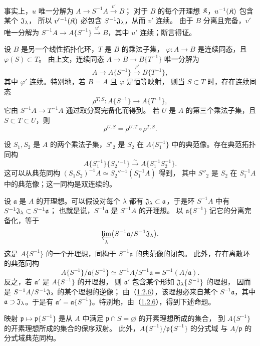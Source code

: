 事实上，$u$ 唯一分解为 $A\to S^{-1}A\xrightarrow{v'}B$；
对于 $B$ 的每个开理想 $\mathfrak K$，$u^{-1}(\mathfrak K)$ 包含某个 $\mathfrak J_\lambda$，
所以 $v'{}^{-1}(\mathfrak K)$ 必包含 $S^{-1}\mathfrak J_\lambda$，从而 $v'$ 连续。
由于 $B$ 分离且完备，$v'$ 唯一分解为
$S^{-1}A\to A\{S^{-1}\}\xrightarrow{u'}B$，其中 $u'$ 连续；断言得证。

设 $B$ 是另一个线性拓扑化环，$T$ 是 $B$ 的乘法子集，
$\varphi:A\to B$ 是连续同态，且 $\varphi(S)\subset T$。
由上文，连续同态 $A\to B\to B\{T^{-1}\}$ 唯一分解为
\[
 A\longrightarrow A\{S^{-1}\}\xrightarrow{\varphi'}B\{T^{-1}\},
\]
其中 $\varphi'$ 连续。特别地，若 $B=A$ 且 $\varphi$ 是恒等映射，
则当 $S\subset T$ 时，存在连续同态
\[
 \rho^{T,S}:A\{S^{-1}\}\longrightarrow A\{T^{-1}\},
\]
它由 $S^{-1}A\to T^{-1}A$ 通过取分离完备化而得到。
若 $U$ 是 $A$ 的第三个乘法子集，且 $S\subset T\subset U$，则
\[
 \rho^{U,S}=\rho^{U,T}\circ\rho^{T,S}.
\]

设 $S_1,S_2$ 是 $A$ 的两个乘法子集，$S'_2$ 是 $S_2$ 在
$A\{S_1^{-1}\}$ 中的典范像。存在典范拓扑同构
\[
 A\{S_1^{-1}\}\{S_2'{}^{-1}\}
 \xrightarrow{\sim}A\{S_1^{-1}S_2^{-1}\}.
\]
这可以从典范同构
$(S_1S_2)^{-1}A\simeq S_2''{}^{-1}(S_1^{-1}A)$ 得到，
其中 $S''_2$ 是 $S_2$ 在 $S_1^{-1}A$ 中的典范像；这一同构是双连续的。

设 $\mathfrak a$ 是 $A$ 的开理想。可以假设对每个 $\lambda$ 都有
$\mathfrak J_\lambda\subset\mathfrak a$，于是环 $S^{-1}A$ 中有
$S^{-1}\mathfrak J_\lambda\subset S^{-1}\mathfrak a$；
也就是说，$S^{-1}\mathfrak a$ 是 $S^{-1}A$ 的开理想。
以 $\mathfrak a\{S^{-1}\}$ 记它的分离完备化，等于
\[
 \varprojlim_\lambda
 \bigl(S^{-1}\mathfrak a/S^{-1}\mathfrak J_\lambda\bigr).
\]
这是 $A\{S^{-1}\}$ 的一个开理想，同构于 $S^{-1}\mathfrak a$ 的典范像的闭包。
此外，存在离散环的典范同构
\[
 A\{S^{-1}\}/\mathfrak a\{S^{-1}\}
 \simeq S^{-1}A/S^{-1}\mathfrak a=S^{-1}(A/\mathfrak a).
\]
反之，若 $\mathfrak a'$ 是 $A\{S^{-1}\}$ 的开理想，
则 $\mathfrak a'$ 包含某个形如 $\mathfrak J_\lambda\{S^{-1}\}$ 的理想，
因而是 $S^{-1}A/S^{-1}\mathfrak J_\lambda$ 的某个理想的逆像；
由（\hyperlink{para:0:1.2.6}{1.2.6}），该理想必来自某个 $S^{-1}\mathfrak a$，其中
$\mathfrak a\supset\mathfrak J_\lambda$。于是有
$\mathfrak a'=\mathfrak a\{S^{-1}\}$。特别地，由（\hyperlink{para:0:1.2.6}{1.2.6}），得到下述命题。

映射 $\mathfrak p\mapsto\mathfrak p\{S^{-1}\}$ 是从 $A$ 中满足
$\mathfrak p\cap S=\varnothing$ 的开素理想所成的集合，
到 $A\{S^{-1}\}$ 的开素理想所成的集合的保序双射。
此外，$A\{S^{-1}\}/\mathfrak p\{S^{-1}\}$ 的分式域
与 $A/\mathfrak p$ 的分式域典范同构。

